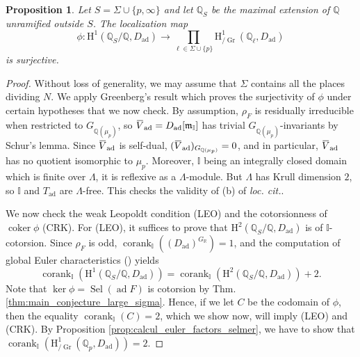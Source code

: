 \documentclass[12pt]{amsart}
\newcommand\bI{\mathbb{I}}
\newcommand\bR{\mathbb{R}}
\newcommand\bQ{\mathbb{Q}}
\newcommand\Qp{{\mathbb{Q}_p}}
\newcommand\gm{\mathfrak{m}}
\newcommand{\ob}[1]{\mkern 1.5mu\overline{\mkern-1.5mu#1\mkern-1.5mu}\mkern 1.5mu}
\DeclareMathOperator{\coker}{coker}
\DeclareMathOperator{\ad}{ad}
\DeclareMathOperator{\Sel}{Sel}
\DeclareMathOperator{\Gr}{Gr}
\DeclareMathOperator{\corank}{corank}
\newcommand{\HH}{\mathrm{H}}
\theoremstyle{defstyle}
\theoremstyle{thmstyle}
\newtheorem{proposition}[subsubsection]{Proposition}
\begin{document}
\begin{proposition}\label{prop:surjectivity_phi}
	Let $S=\Sigma\cup\{p,\infty\}$ and let $\bQ_S$ be the maximal extension of $\bQ$ unramified outside $S$. The localization map 
	\[\phi \colon \HH^1(\bQ_S/\bQ,D_{\ad}) \to \prod_{\ell\in\Sigma\cup\{p\}} \HH^1_{\slash\Gr}(\bQ_\ell,D_{\ad}) \]
	is surjective.
\end{proposition}
\begin{proof}
Without loss of generality, we may assume that $\Sigma$ contains all the places dividing $N$. We apply Greenberg's result \cite[Prop. 2.6.3]{greenberg2015structure} which proves the surjectivity of $\phi$ under certain hypotheses that we now check. By assumption, $\rho_{F}$ is residually irreducible when restricted to $G_{\bQ(\mu_p)}$, so $\ob{V}_{\ad}=D_{\ad}[\gm_\bI]$ has trivial $G_{\bQ(\mu_p)}$-invariants by Schur's lemma. Since $\ob{V}_{\ad}$ is self-dual, $(\ob{V}_{\ad})_{G_{\bQ(\mu_p)}}=0$, and in particular, $\ob{V}_{\ad}$ has no quotient isomorphic to $\mu_p$. Moreover, $\bI$ being an integrally closed domain which is finite over $\Lambda$, it is reflexive as a $\Lambda$-module. But $\Lambda$ has Krull dimension $2$, so $\bI$ and $T_{\ad}$ are $\Lambda$-free. This checks the validity of (b) of \textit{loc. cit.}.

We now check the weak Leopoldt condition (LEO) and the cotorsionness of $\coker\phi$ (CRK). For (LEO), it suffices to prove that $\HH^2(\bQ_S/\bQ,D_{\ad})$ is of $\bI$-cotorsion. Since $\rho_F$ is odd, $\corank_{\bI}((D_{\ad})^{G_{\bR}})=1$, and the computation of global Euler characteristics (\cite[\S2.3]{greenberg2015structure}) yields 
\[ \corank_{\bI}(\HH^1(\bQ_S/\bQ,D_{\ad}))=\corank_{\bI}(\HH^2(\bQ_S/\bQ,D_{\ad}))+2.\]
Note that $\ker \phi=\Sel(\ad F)$ is cotorsion by Thm. \ref{thm:main_conjecture_large_sigma}. Hence, if we let $C$ be the codomain of $\phi$, then the equality $\corank_{\bI}(C)= 2$, which we show now, will imply (LEO) and (CRK). By Proposition \ref{prop:calcul_euler_factors_selmer}, we have to show that $\corank_{\bI}(\HH^1_{\slash\Gr}(\Qp,D_{\ad}))=2$. 


\end{proof}
\end{document}

